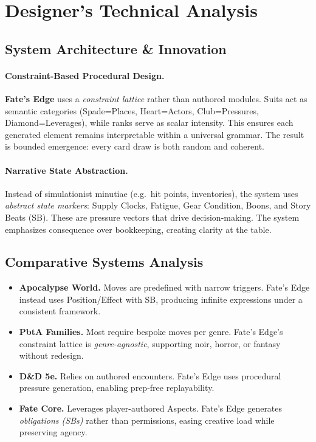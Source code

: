 
\section{Designer’s Technical Analysis}
\label{appendix:technical-analysis}

\subsection{System Architecture \& Innovation}

\paragraph{Constraint-Based Procedural Design.}
\textbf{Fate’s Edge} uses a \emph{constraint lattice} rather than authored modules. Suits act as semantic categories (Spade=Places, Heart=Actors, Club=Pressures, Diamond=Leverages), while ranks serve as scalar intensity. This ensures each generated element remains interpretable within a universal grammar. The result is bounded emergence: every card draw is both random and coherent.

\paragraph{Narrative State Abstraction.}
Instead of simulationist minutiae (e.g.\ hit points, inventories), the system uses \emph{abstract state markers}: Supply Clocks, Fatigue, Gear Condition, Boons, and Story Beats (SB). These are pressure vectors that drive decision-making. The system emphasizes consequence over bookkeeping, creating clarity at the table.

\subsection{Comparative Systems Analysis}

\begin{itemize}
  \item \textbf{Apocalypse World.} Moves are predefined with narrow triggers. Fate’s Edge instead uses Position/Effect with SB, producing infinite expressions under a consistent framework.
  \item \textbf{PbtA Families.} Most require bespoke moves per genre. Fate’s Edge’s constraint lattice is \emph{genre-agnostic}, supporting noir, horror, or fantasy without redesign.
  \item \textbf{D\&D 5e.} Relies on authored encounters. Fate’s Edge uses procedural pressure generation, enabling prep-free replayability.
  \item \textbf{Fate Core.} Leverages player-authored Aspects. Fate’s Edge generates \emph{obligations (SBs)} rather than permissions, easing creative load while preserving agency.
\end{itemize}

